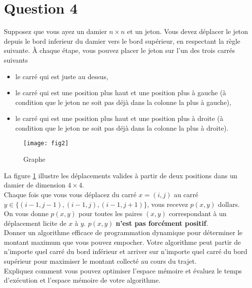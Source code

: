 \documentclass[devoir3.tex]{subfiles}
\begin{document}
\section*{Question 4}
Supposez que vous ayez un damier \(n \times n\) et un jeton. Vous devez déplacer
le jeton depuis le bord inferieur du damier vers le bord supérieur, en respectant la règle suivante. À chaque étape, vous pouvez placer le jeton sur l’un des trois carrés suivants

\begin{itemize}
	\item le carré qui est juste au dessus,
	\item le carré qui est une position plus haut et une position plus à gauche (à condition que le jeton ne soit pas déjà dans la colonne la plus à gauche),
	\item le carré qui est une position plus haut et une position plus à droite (à condition que le jeton ne soit pas déjà dans la colonne la plus à droite).
\end{itemize}

\begin{figure}[H]
	\centering
	\texttt{[image: fig2]}
	\caption{Graphe}
	\label{fig:fig2}   
\end{figure}

La figure \ref{fig:fig2} illustre les déplacements valides à partir de deux positions dans un damier de dimension \(4 \times 4\). \\

Chaque fois que vous vous déplacez du carré \(x = (i, j)\) au carré \(y \in \lbrace (i-1,j-1),(i-1,j),(i-1,j+1) \rbrace \), vous recevez \(p(x, y)\) dollars. On vous donne \(p(x, y)\) pour toutes les paires \((x, y)\) correspondant à un déplacement licite de \(x\) à \(y\). \(p(x, y)\) \textbf{n’est pas forcément positif}. \\

Donner un algorithme efficace de programmation dynamique pour déterminer le montant maximum que vous pouvez empocher. Votre algorithme peut partir de n’importe quel carré du bord inférieur et arriver sur n’importe quel carré du bord supérieur pour maximiser le montant collecté au cours du trajet. \\

Expliquez comment vous pouvez optimiser l’espace mémoire et évaluez le temps d’exécution et l’espace mémoire de votre algorithme. \\
\end{document}
